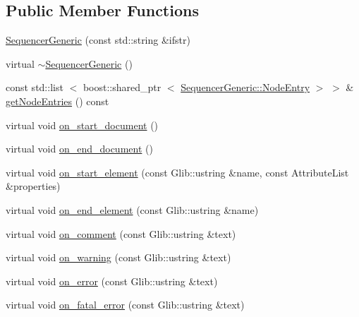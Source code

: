 \subsection*{\-Public \-Member \-Functions}
\begin{DoxyCompactItemize}
\item 
\hyperlink{classcryomesh_1_1utilities_1_1SequencerGeneric_ad0e50f0a304a248df61ca43e7bfd0717}{\-Sequencer\-Generic} (const std\-::string \&ifstr)
\item 
virtual \hyperlink{classcryomesh_1_1utilities_1_1SequencerGeneric_aabe2ac353f7c805827a7a652cf1a8e23}{$\sim$\-Sequencer\-Generic} ()
\item 
const std\-::list\*
$<$ boost\-::shared\-\_\-ptr\*
$<$ \hyperlink{structcryomesh_1_1utilities_1_1SequencerGeneric_1_1NodeEntry}{\-Sequencer\-Generic\-::\-Node\-Entry} $>$ $>$ \& \hyperlink{classcryomesh_1_1utilities_1_1SequencerGeneric_a5537ecb58c9308c82be295c871001efd}{get\-Node\-Entries} () const 
\item 
virtual void \hyperlink{classcryomesh_1_1utilities_1_1SequencerGeneric_a071c15286ad8aac33fa73ff5cc78136b}{on\-\_\-start\-\_\-document} ()
\item 
virtual void \hyperlink{classcryomesh_1_1utilities_1_1SequencerGeneric_a5d38706a972e2037ba5a22cd04f273a0}{on\-\_\-end\-\_\-document} ()
\item 
virtual void \hyperlink{classcryomesh_1_1utilities_1_1SequencerGeneric_ac9307acc5a461e9da6272a7aafcd0cf7}{on\-\_\-start\-\_\-element} (const \-Glib\-::ustring \&name, const \-Attribute\-List \&properties)
\item 
virtual void \hyperlink{classcryomesh_1_1utilities_1_1SequencerGeneric_ad7d0c1c324c09ccbeba7c54caa6a77aa}{on\-\_\-end\-\_\-element} (const \-Glib\-::ustring \&name)
\item 
virtual void \hyperlink{classcryomesh_1_1utilities_1_1SequencerGeneric_a1db9b60c25849b178124e9761d0ded64}{on\-\_\-comment} (const \-Glib\-::ustring \&text)
\item 
virtual void \hyperlink{classcryomesh_1_1utilities_1_1SequencerGeneric_aa8f08fad1118ad8d2a787f2f8b50df47}{on\-\_\-warning} (const \-Glib\-::ustring \&text)
\item 
virtual void \hyperlink{classcryomesh_1_1utilities_1_1SequencerGeneric_a797f1cda33a8dfff5fdb4d5fa095a90b}{on\-\_\-error} (const \-Glib\-::ustring \&text)
\item 
virtual void \hyperlink{classcryomesh_1_1utilities_1_1SequencerGeneric_af464b348d68b6ae93f473c0e02a05ff2}{on\-\_\-fatal\-\_\-error} (const \-Glib\-::ustring \&text)
\end{DoxyCompactItemize}

